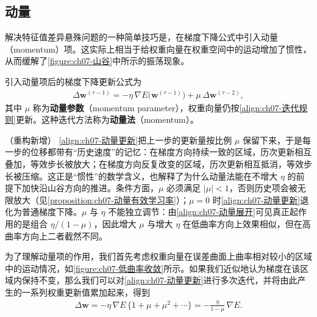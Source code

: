 \documentclass[../../main.tex]{subfiles}
\begin{document}
\subsection{动量}\label{subsection:ch07-动量}

解决特征值差异悬殊问题的一种简单技巧是，在梯度下降公式中引入动量（momentum）项。这实际上相当于给权重向量在权重空间中的运动增加了惯性，从而缓解了\cref{figure:ch07-山谷}中所示的振荡现象。

\begin{definition}[动量]\label{definition:ch07-动量}
引入动量项后的梯度下降更新公式为
\begin{align}
\Delta\mathbf{w}^{(\tau-1)} = -\eta\,\nabla E\bigl(\mathbf{w}^{(\tau-1)}\bigr)+\mu\,\Delta\mathbf{w}^{(\tau-2)},
\label{align:ch07-动量更新}
\end{align}
其中 $\mu$ 称为\textbf{动量参数}（momentum parameter），权重向量仍按\eqref{align:ch07-迭代规则}更新。这种迭代方法称为\textbf{动量法}（momentum）。
\end{definition}

\begin{remark}（重构新增）
\eqref{align:ch07-动量更新}把上一步的更新量按比例 $\mu$ 保留下来，于是每一步的位移都带有“历史速度”的记忆：在梯度方向持续一致的区域，历次更新相互叠加，等效步长被放大；在梯度方向反复改变的区域，历次更新相互抵消，等效步长被压缩。这正是“惯性”的数学含义，也解释了为什么动量法能在不增大 $\eta$ 的前提下加快沿山谷方向的推进。条件方面，$\mu$ 必须满足 $|\mu|<1$，否则历史项会被无限放大（见\cref{proposition:ch07-动量有效学习率}）；$\mu=0$ 时\eqref{align:ch07-动量更新}退化为普通梯度下降。$\mu$ 与 $\eta$ 不能独立调节：由\eqref{align:ch07-动量展开}可见真正起作用的是组合 $\eta/(1-\mu)$，因此增大 $\mu$ 与增大 $\eta$ 在低曲率方向上效果相似，但在高曲率方向上二者截然不同。
\end{remark}

为了理解动量项的作用，我们首先考虑权重向量在误差曲面上曲率相对较小的区域中的运动情况，如\cref{figure:ch07-低曲率收敛}所示。如果我们近似地认为梯度在该区域内保持不变，那么我们可以对\eqref{align:ch07-动量更新}进行多次迭代，并将由此产生的一系列权重更新值累加起来，得到
\begin{align}
\Delta\mathbf{w} = -\eta\,\nabla E\,\{1+\mu+\mu^{2}+\cdots\} = -\frac{\eta}{1-\mu}\,\nabla E.
\label{align:ch07-动量展开}
\end{align}
\end{document}

